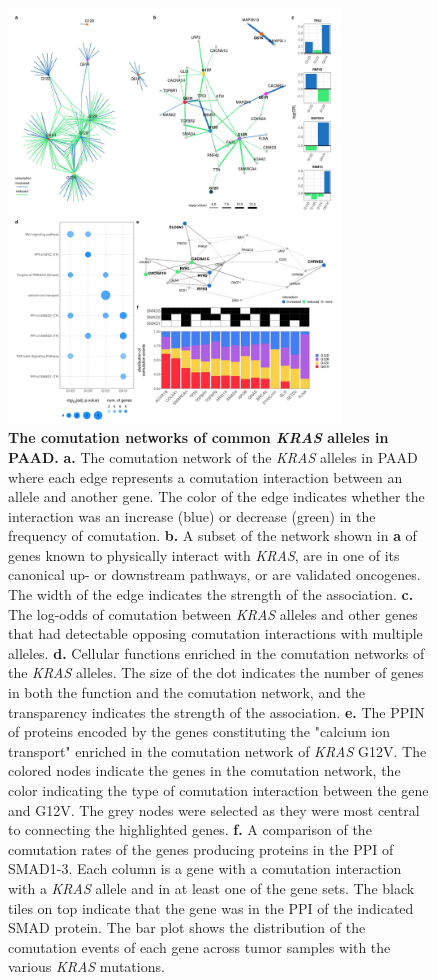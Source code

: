 \documentclass[english, 10pt, letterpaper]{article}
\newcommand{\KRAS}{\emph{KRAS}}
\begin{document}
\begin{figure}[p]
\centering
\includegraphics[height=110mm]{figures/Supp_Fig_5.jpeg}
\caption{
    \textbf{The comutation networks of common \KRAS{} alleles in PAAD.}
    \textbf{a.} The comutation network of the \KRAS{} alleles in PAAD where each edge represents a comutation interaction between an allele and another gene. The color of the edge indicates whether the interaction was an increase (blue) or decrease (green) in the frequency of comutation.
    \textbf{b.} A subset of the network shown in \textbf{a} of genes known to physically interact with \KRAS{}, are in one of its canonical up- or downstream pathways, or are validated oncogenes. The width of the edge indicates the strength of the association.
    \textbf{c.} The log-odds of comutation between \KRAS{} alleles and other genes that had detectable opposing comutation interactions with multiple alleles.
    \textbf{d.} Cellular functions enriched in the comutation networks of the \KRAS{} alleles. The size of the dot indicates the number of genes in both the function and the comutation network, and the transparency indicates the strength of the association.
    \textbf{e.} The PPIN of proteins encoded by the genes constituting the "calcium ion transport" enriched in the comutation network of \KRAS{} G12V. The colored nodes indicate the genes in the comutation network, the color indicating the type of comutation interaction between the gene and G12V. The grey nodes were selected as they were most central to connecting the highlighted genes.
    \textbf{f.} A comparison of the comutation rates of the genes producing proteins in the PPI of SMAD1-3. Each column is a gene with a comutation interaction with a \KRAS{} allele and in at least one of the gene sets. The black tiles on top indicate that the gene was in the PPI of the indicated SMAD protein. The bar plot shows the distribution of the comutation events of each gene across tumor samples with the various \KRAS{} mutations.
}
\label{sfig:paad-comutation}
\end{figure}
\end{document}

